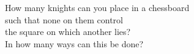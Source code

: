 \documentclass[preview]{standalone}
\begin{document}
\begin{center}
How many knights can you place in a chessboard \\ such that none on them control \\ the square on which another lies?\\ In how many ways can this be done?
\end{center}
\end{document}
